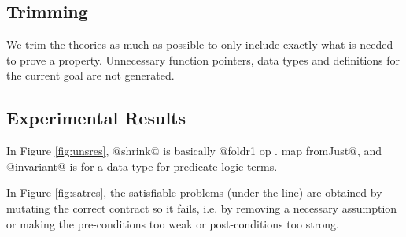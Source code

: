 \subsection{Trimming}

We trim the theories as much as possible to only include exactly what
is needed to prove a property. Unnecessary function pointers, data
types and definitions for the current goal are not generated.

%
%
%

\subsection{Experimental Results}



In Figure \ref{fig:unsres}, @shrink@ is basically
@foldr1 op . map fromJust@, and @invariant@ is for a data type
for predicate logic terms.

In Figure \ref{fig:satres}, the satisfiable problems (under the line) are
obtained by mutating the correct contract so it fails, i.e.  by
removing a necessary assumption or making the pre-conditions too weak
or post-conditions too strong.


